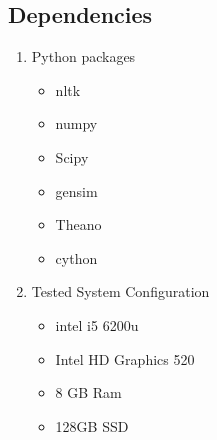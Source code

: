 \subsection{Dependencies}

\begin{enumerate}
\item   Python packages

\begin{itemize}
\item nltk
\item numpy
\item Scipy
\item gensim
\item Theano
\item cython
\end{itemize}
\item Tested System Configuration
\begin{itemize}

\item intel i5 6200u
\item Intel HD Graphics 520
\item 8 GB Ram
\item 128GB SSD

\end{itemize}

\end{enumerate}